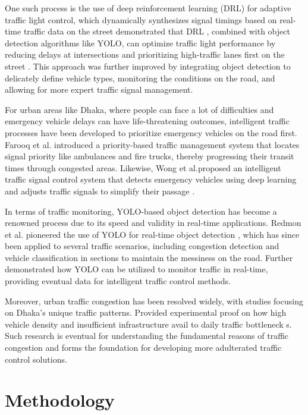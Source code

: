 \documentclass[usenatbib]{tjaa}
\begin{document}
One such process is the use of deep reinforcement learning (DRL) for adaptive traffic light control, which dynamically synthesizes signal timings based on real-time traffic data on the street demonstrated that DRL \citep{clar:a6}, combined with object detection algorithms like YOLO, can optimize traffic light performance by reducing delays at intersections and prioritizing high-traffic lanes first on the street \citep{clar:a15}. This approach was further improved by integrating object detection to delicately define vehicle types, monitoring the conditions on the road, and allowing for more expert traffic signal management.


For urban areas like Dhaka, where people can face a lot of difficulties and emergency vehicle delays can have life-threatening outcomes, intelligent traffic processes have been developed to prioritize emergency vehicles on the road first. Farooq et al. introduced a priority-based traffic management system that locates signal priority like ambulances and fire trucks, thereby progressing their transit times through congested areas. Likewise, Wong et al.proposed an intelligent traffic signal control system that detects emergency vehicles using deep learning and adjusts traffic signals to simplify their passage \citep{clar:a8}.


In terms of traffic monitoring, YOLO-based object detection has become a renowned process due to its speed and validity in real-time applications. Redmon et al. pioneered the use of YOLO for real-time object detection \citep{clar:a14}, which has since been applied to several traffic scenarios, including congestion detection and vehicle classification in sections to maintain the messiness on the road. Further demonstrated how YOLO can be utilized to monitor traffic in real-time, providing eventual data for intelligent traffic control methods.


Moreover, urban traffic congestion has been resolved widely, with studies focusing on Dhaka's unique traffic patterns. Provided experimental proof on how high vehicle density and insufficient infrastructure avail to daily traffic bottleneck \citep{clar:a9}s. Such research is eventual for understanding the fundamental reasons of traffic congestion and forms the foundation for developing more adulterated traffic control solutions.


\section[]{Methodology}
\end{document}
